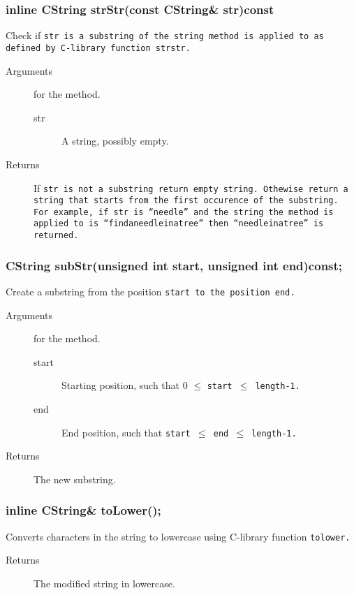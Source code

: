 \subsubsection{inline CString strStr(const CString\& str)const}
Check if \tt str \rm is a substring of the string method is
applied to as defined by C-library function \tt strstr\rm. 
 \begin{description}
    \item [Arguments] for the method.
      \begin{description}
        \item [str] A string, possibly empty.
      \end{description}
    \item [Returns] If \tt str \rm is not a substring return empty string. 
                    Othewise return a string that starts from the
                    first occurence of the substring. For example, 
                    if \tt str \rm is ``needle'' and the string the method is 
                    applied to is ``findaneedleinatree'' then
                    ``needleinatree'' is returned.
 \end{description}

\subsubsection{CString subStr(unsigned int start, unsigned int end)const;}
Create a substring from the position \tt start \rm to the position 
\tt end\rm.

 \begin{description}
    \item [Arguments] for the method.
      \begin{description}
        \item [start] Starting position, such that 0 $\leq$ \tt start \rm 
                      $\leq$ length-1.
        \item [end] End position, such that \tt start \rm  $\leq$
                    \tt end \rm $\leq$ length-1.
      \end{description} 
      \item[Returns] The new substring.
 \end{description} 
  
\subsubsection{inline CString\& toLower();}
Converts characters in the string to lowercase using C-library function 
\tt tolower\rm. 
 \begin{description}
    \item [Returns] The modified string in lowercase. 
 \end{description} 
 

